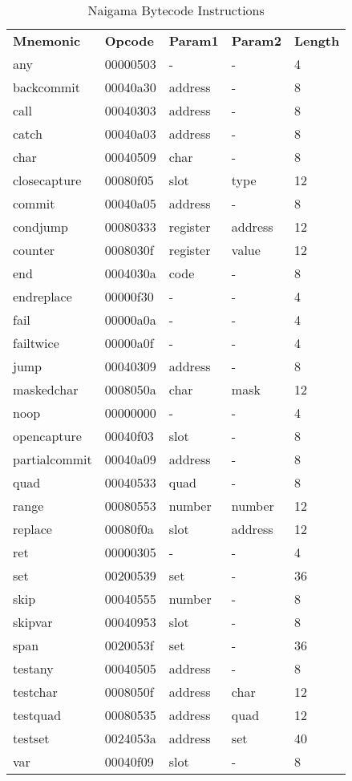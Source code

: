 
\begin{table}[]
\centering
\caption{Naigama Bytecode Instructions}
\label{tab:naig_bytecode}
\begin{tabular}{lllll}
\textbf{Mnemonic} & \textbf{Opcode} & \textbf{Param1} & \textbf{Param2} & \textbf{Length} \\
any & 00000503 & - & -  & 4 \\
backcommit & 00040a30 & address & -  & 8 \\
call & 00040303 & address & -  & 8 \\
catch & 00040a03 & address & -  & 8 \\
char & 00040509 & char & -  & 8 \\
closecapture & 00080f05 & slot & type  & 12 \\
commit & 00040a05 & address & -  & 8 \\
condjump & 00080333 & register & address  & 12 \\
counter & 0008030f & register & value  & 12 \\
end & 0004030a & code & -  & 8 \\
endreplace & 00000f30 & - & -  & 4 \\
fail & 00000a0a & - & -  & 4 \\
failtwice & 00000a0f & - & -  & 4 \\
jump & 00040309 & address & -  & 8 \\
maskedchar & 0008050a & char & mask  & 12 \\
noop & 00000000 & - & -  & 4 \\
opencapture & 00040f03 & slot & -  & 8 \\
partialcommit & 00040a09 & address & -  & 8 \\
quad & 00040533 & quad & -  & 8 \\
range & 00080553 & number & number  & 12 \\
replace & 00080f0a & slot & address  & 12 \\
ret & 00000305 & - & -  & 4 \\
set & 00200539 & set & -  & 36 \\
skip & 00040555 & number & -  & 8 \\
skipvar & 00040953 & slot & -  & 8 \\
span & 0020053f & set & -  & 36 \\
testany & 00040505 & address & -  & 8 \\
testchar & 0008050f & address & char  & 12 \\
testquad & 00080535 & address & quad  & 12 \\
testset & 0024053a & address & set  & 40 \\
var & 00040f09 & slot & -  & 8 \\
\end{tabular}
\end{table}
